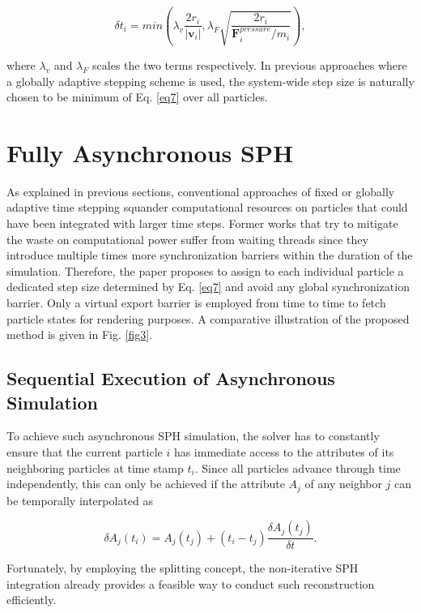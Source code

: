 \documentclass[
	11pt, 
	DIV10,
	ngerman,
	a4paper, 
	oneside, 
	headings=normal, 
	captions=tableheading,
	final, 
	numbers=noenddot
]{scrartcl}
\begin{document}
\begin{equation}
	\label{eq7}
	\delta t_{i} = min(\lambda_{v}\frac{2r_{i}}{|\boldsymbol{v}_{i}|}, \lambda_{F}\sqrt{\frac{2r_{i}}{\boldsymbol{F}_{i}^{pressure}/m_{i}}}),
\end{equation}

where $ \lambda_{v} $ and $ \lambda_{F} $ scales the two terms respectively. In previous approaches where a globally adaptive stepping scheme is used, the system-wide step size is naturally chosen to be minimum of Eq. \eqref{eq7} over all particles.


\section{Fully Asynchronous SPH}

As explained in previous sections, conventional approaches of fixed or globally adaptive time stepping squander computational resources on particles that could have been integrated with larger time steps. Former works that try to mitigate the waste on computational power suffer from waiting threads since they introduce multiple times more synchronization barriers within the duration of the simulation. Therefore, the paper proposes to assign to each individual particle a dedicated step size determined by Eq. \eqref{eq7} and avoid any global synchronization barrier. Only a virtual export barrier is employed from time to time to fetch particle states for rendering purposes. A comparative illustration of the proposed method is given in Fig. \ref{fig3}.

\subsection{Sequential Execution of Asynchronous Simulation}

To achieve such asynchronous SPH simulation, the solver has to constantly ensure that the current particle $ i $ has immediate access to the attributes of its neighboring particles at time stamp $ t_{i} $. Since all particles advance through time independently, this can only be achieved if the attribute $ A_{j} $ of any neighbor $ j $ can be temporally interpolated as

\begin{equation}
	\label{eq9}
	\delta A_{j}(t_{i}) = A_{j}(t_{j}) + (t_{i} - t_{j})\frac{\delta A_{j}(t_{j})}{\delta t}.
\end{equation}

Fortunately, by employing the splitting concept, the non-iterative SPH integration already provides a feasible way to conduct such reconstruction efficiently.
\end{document}

